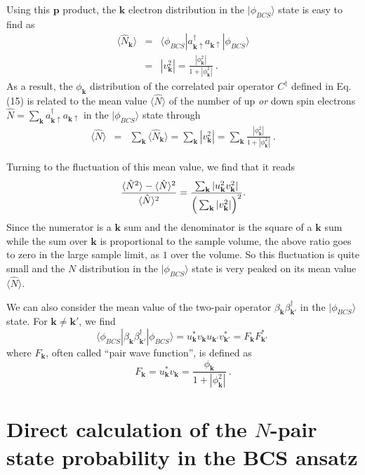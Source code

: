 \documentclass[twocolumn,showpacs]{revtex4}
\def\v#1{\mathbf{#1}}
\begin{document}
Using this $\v p$ product, the $\v k$ electron distribution in the $|\phi_{BCS}\rangle$ state is easy to find as
\begin{eqnarray}
\langle\hat{N}_{\v k}\rangle&=&\langle\phi_{BCS}|a_{\v k\uparrow}^\dag a_{\v k\uparrow}|\phi_{BCS}\rangle\nonumber\\
&=&|v_{\v k}^2|=\frac{|\phi_{\v k}^2|}{1+|\phi_{\v k}^2|}\ .
\end{eqnarray}
As a result, the $\phi_{\v k}$ distribution of the correlated pair operator $C^\dag$ defined in Eq.(15) is related to the mean value $\langle\hat{N}\rangle$ of the number of up \emph{or} down spin electrons $\hat{N}=\sum_{\v k}a_{\v k\uparrow}^\dag a_{\v k\uparrow}$ in the $|\phi_{BCS}\rangle$ state through
\begin{eqnarray}
\langle\hat{N}\rangle&=&\sum_{\v k}\langle\hat{N}_{\v k}\rangle=\sum_{\v{k}}|v_{\v k}^2|
=\sum_{\v k}\frac{|\phi_{\v k}^2|}{1+|\phi_{\v k}^2|}\ .
\end{eqnarray}

Turning to the fluctuation of this mean value, we find that it reads
\begin{equation}
\frac{\langle\hat{N}^2\rangle-\langle\hat{N}\rangle^2}{\langle\hat{N}\rangle^2}=\frac{\sum_{\v k}|u_{\v k}^2v_{\v k}^2|}{\Big{(}\sum_{\v k}|v_{\v k}^2|\Big{)}^2}.
\end{equation}
Since the numerator is a $\v k$ sum and  the denominator is the square of a $\v k$ sum while the sum over $\v{k}$ is proportional to the sample volume, the above ratio goes to zero in the large sample limit, as $1$ over the volume. So this fluctuation is quite small and the $N$ distribution in the $|\phi_{BCS}\rangle$ state is very peaked on its mean value $\langle\hat{N}\rangle$.

We can also consider the mean value of the two-pair operator $\beta_{\v k}\beta_{\v k'}^\dag$ in the $|\phi_{BCS}\rangle$ state. For $\v k\neq\v k'$, we find
\begin{equation}
\langle\phi_{BCS}|\beta_{\v k}\beta_{\v k'}^\dag|\phi_{BCS}\rangle=u_{\v k}^\ast v_{\v k}u_{\v k'}v_{\v k'}^\ast=F_{\v k}F_{\v k'}^\ast\ 
\end{equation}
where $F_{\v k}$, often called ``pair wave function'', is defined as
\begin{equation}\label{fn}
F_{\v k}=u_{\v k}^\ast v_{\v k}=\frac{\phi_{\v k}}{1+|\phi_{\v k}^2|}\ .
\end{equation}

\section{Direct calculation of the $N$-pair state probability in the BCS ansatz}
\end{document}
